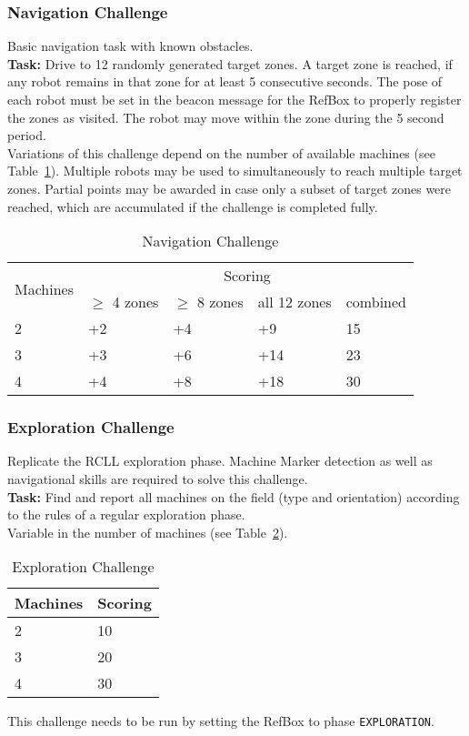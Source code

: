 \documentclass[12pt,twoside]{article}
\newcommand{\reftab}[1]{Table~\ref{#1}}
\begin{document}
\subsubsection{Navigation Challenge}\label{sec:challenge-navigation}
Basic navigation task with known obstacles.\\
\textbf{Task:} Drive to 12 randomly generated target zones. A target zone is
reached, if any robot remains in that zone for at least 5 consecutive seconds.
The pose of each robot must be set in the beacon message
for the RefBox to properly register the zones as visited. The robot may move
within the zone during the 5 second period.\\
Variations of this challenge depend on the number of available machines
(see \reftab{tab:challenge-navigation}).
Multiple robots may be used to simultaneously to reach multiple target zones.
Partial points may be awarded in case only a subset of target zones were
reached, which are accumulated if the challenge is completed fully.

\begin{table}[!htb]
 \centering
 \begin{tabular}{l|l|l|l|l}
  \multirow{2}{*}{Machines}
  & \multicolumn{4}{c}{Scoring} \\\cline{2-5}
	& $\geq$ 4 zones  & $\geq$ 8 zones & all 12 zones  & combined \\\hline\hline
	 2 & +2 & +4 & +9 & 15 \\
	 3 & +3 & +6 & +14 & 23 \\
	 4 & +4 & +8 & +18 & 30 \\
 \end{tabular}
 \caption{Navigation Challenge}
 \label{tab:challenge-navigation}
\end{table}

\subsubsection{Exploration Challenge}\label{sec:challenge-exploration}
Replicate the RCLL exploration phase.
Machine Marker detection as well as navigational skills are required to solve
this challenge.\\
\textbf{Task:} Find and report all machines on the field (type and orientation)
according to the rules of a regular exploration phase.
\\
Variable in the number of machines
(see \reftab{tab:challenge-exploration}).
\begin{table}[!htb]
 \centering
 \begin{tabular}{l|l}
  Machines & Scoring \\\hline
  2   & 10 \\
  3   & 20 \\
  4   & 30 \\
 \end{tabular}
 \caption{Exploration Challenge}
 \label{tab:challenge-exploration}
\end{table}
This challenge needs to be run by setting the RefBox to phase
\texttt{EXPLORATION}.
\end{document}
